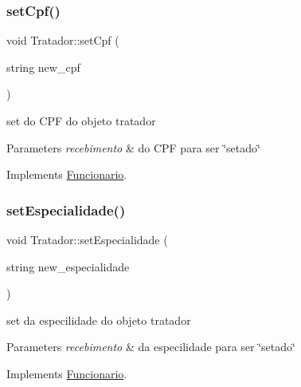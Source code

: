 \mbox{\label{class_tratador_ae55609b3a97e126867f196a5c446c05f}} 
\subsubsection{\texorpdfstring{setCpf()}{setCpf()}}
{\footnotesize\ttfamily void Tratador\+::set\+Cpf (\begin{DoxyParamCaption}\item[{string}]{new\+\_\+cpf }\end{DoxyParamCaption})\hspace{0.3cm}{\ttfamily [virtual]}}



set do C\+PF do objeto tratador 


\begin{DoxyParams}{Parameters}
{\em recebimento} & do C\+PF para ser \char`\"{}setado\char`\"{} \\
\hline
\end{DoxyParams}


Implements \mbox{\hyperlink{class_funcionario}{Funcionario}}.

\mbox{\label{class_tratador_a6fdd83ffb609aab0f335892c9df5c146}} 
\subsubsection{\texorpdfstring{setEspecialidade()}{setEspecialidade()}}
{\footnotesize\ttfamily void Tratador\+::set\+Especialidade (\begin{DoxyParamCaption}\item[{string}]{new\+\_\+especialidade }\end{DoxyParamCaption})\hspace{0.3cm}{\ttfamily [virtual]}}



set da especilidade do objeto tratador 


\begin{DoxyParams}{Parameters}
{\em recebimento} & da especilidade para ser \char`\"{}setado\char`\"{} \\
\hline
\end{DoxyParams}


Implements \mbox{\hyperlink{class_funcionario}{Funcionario}}.

